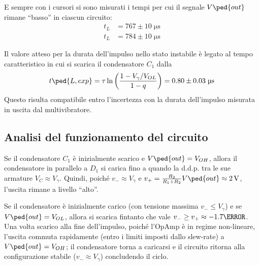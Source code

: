 \documentclass[10pt, a4paper, italian]{article}
\begin{document}
E sempre con i cursori si sono misurati i tempi per cui il segnale $V\ped{out}$
rimane ``basso'' in ciascun circuito:
\begin{align*}
t_L &= 767 \pm 10 \;\si{\micro\s} \\
t_L &= 784 \pm 10 \;\si{\micro\s}
\end{align*}

Il valore atteso per la durata dell'impulso nello stato instabile è legato
al tempo caratteristico in cui si scarica il condensatore $C_1$ dalla
\begin{equation}\label{eq: mstable_Delta}
t\ped{L, exp} = \tau \ln{\left(\frac{1 - V_\gamma/V_{OL}}{1 - q}\right)} =
0.80 \pm 0.03 \; \si{\micro\s}
\end{equation}
Questo risulta compatibile entro l'incertezza con la durata dell'impulso
misurata in uscita dal multivibratore.

\subsection{Analisi del funzionamento del circuito}
Se il condensatore $C_1$ è inizialmente scarico e $V\ped{out} = V_{OH}$, allora
il condensatore in parallelo a $D_1$ si carica fino a quando la d.d.p. tra le
sue armature $V_C \approx V_{\gamma}$. Quindi, poiché $v_- \approx V_{\gamma}$
e $v_+ = \frac{R_{2}}{R_{1} + R_{2}} V\ped{out} \approx \SI{2}{V}$, l'uscita
rimane a livello ``alto''.

Se il condensatore è inizialmente carico (con tensione massima
$v_- \leq V_\gamma$) e se $V\ped{out} = V_{OL}$, allora si scarica fintanto
che vale $v_- \geq v_+ \approx - 1.7 {\V}$. Una volta scarico alla fine
dell'impulso, poiché l'OpAmp è in regime non-lineare, l'uscita commuta
rapidamente (entro i limiti imposti dallo slew-rate) a $V\ped{out} = V_{OH}$;
il condensatore torna a caricarsi e il circuito ritorna alla configurazione
stabile ($v_- \approx V_\gamma$) concludendo il ciclo.
\end{document}
